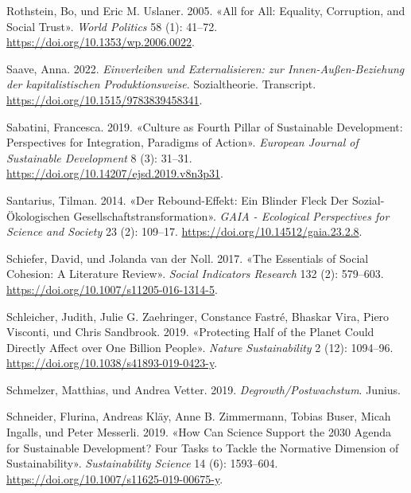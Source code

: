 \documentclass[
  nswissgerman,
  a4paper,
  DIV=11,
  numbers=noendperiod,
  oneside,
  openany]{scrreprt}
\newlength{\cslhangindent}
\newenvironment{CSLReferences}[2] %
 {\begin{list}{}{%
  \setlength{\itemindent}{0pt}
  \setlength{\leftmargin}{0pt}
  \setlength{\parsep}{0pt}
  \ifodd #1
   \setlength{\leftmargin}{\cslhangindent}
   \setlength{\itemindent}{-1\cslhangindent}
  \fi
  \setlength{\itemsep}{#2\baselineskip}}}
 {\end{list}}
\begin{document}
\begin{CSLReferences}{1}{1}
Rothstein, Bo, und Eric M. Uslaner. 2005. {«All for {All}: {Equality},
{Corruption}, and {Social Trust}»}. \emph{World Politics} 58 (1):
41--72. \url{https://doi.org/10.1353/wp.2006.0022}.

Saave, Anna. 2022. \emph{{Einverleiben und Externalisieren: zur
Innen-Au{ß}en-Beziehung der kapitalistischen Produktionsweise}}.
{Sozialtheorie}. Transcript.
\url{https://doi.org/10.1515/9783839458341}.

Sabatini, Francesca. 2019. {«Culture as {Fourth Pillar} of {Sustainable
Development}: {Perspectives} for {Integration}, {Paradigms} of
{Action}»}. \emph{European Journal of Sustainable Development} 8 (3):
31--31. \url{https://doi.org/10.14207/ejsd.2019.v8n3p31}.

Santarius, Tilman. 2014. {«Der {Rebound-Effekt}: Ein Blinder {Fleck} Der
Sozial-{Ö}kologischen {Gesellschaftstransformation}»}. \emph{GAIA -
Ecological Perspectives for Science and Society} 23 (2): 109--17.
\url{https://doi.org/10.14512/gaia.23.2.8}.

{Schiefer, David, und Jolanda van der Noll}. 2017. {«The {Essentials} of
{Social Cohesion}: {A Literature Review}»}. \emph{Social Indicators
Research} 132 (2): 579--603.
\url{https://doi.org/10.1007/s11205-016-1314-5}.

Schleicher, Judith, Julie G. Zaehringer, Constance Fastré, Bhaskar Vira,
Piero Visconti, und Chris Sandbrook. 2019. {«Protecting Half of the
Planet Could Directly Affect over One Billion People»}. \emph{Nature
Sustainability} 2 (12): 1094--96.
\url{https://doi.org/10.1038/s41893-019-0423-y}.

Schmelzer, Matthias, und Andrea Vetter. 2019.
\emph{Degrowth/{Postwachstum}}. Junius.

Schneider, Flurina, Andreas Kläy, Anne B. Zimmermann, Tobias Buser,
Micah Ingalls, und Peter Messerli. 2019. {«How Can Science Support the
2030 {Agenda} for {Sustainable Development}? {Four} Tasks to Tackle the
Normative Dimension of Sustainability»}. \emph{Sustainability Science}
14 (6): 1593--604. \url{https://doi.org/10.1007/s11625-019-00675-y}.


\end{CSLReferences}
\end{document}
